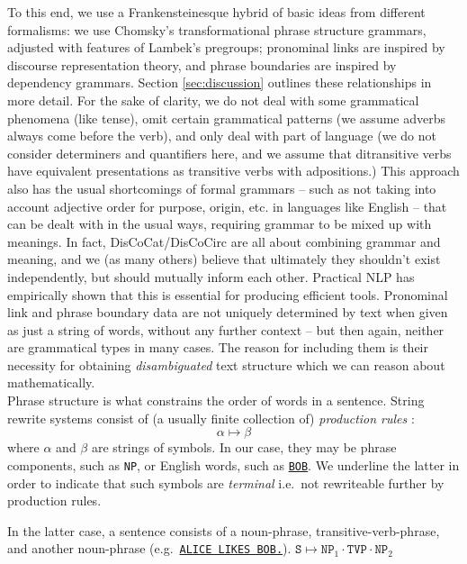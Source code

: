  To this end, we use a Frankensteinesque hybrid of basic ideas from different formalisms: we use Chomsky's transformational phrase structure grammars, adjusted with features of Lambek's pregroups; pronominal links are inspired by discourse representation theory, and phrase boundaries are inspired by dependency grammars. Section \ref{sec:discussion} outlines these relationships in more detail. For the sake of clarity, we do not deal with some grammatical phenomena (like tense), omit certain grammatical patterns (we assume adverbs always come before the verb), and only deal with part of language (we do not consider determiners and quantifiers here, and we assume that ditransitive verbs have equivalent presentations as transitive verbs with adpositions.) This approach also has the usual shortcomings of formal grammars -- such as not taking into account adjective order for purpose, origin, etc. in languages like English -- that can be dealt with in the usual ways, requiring grammar to be mixed up with meanings. In fact, DisCoCat/DisCoCirc are all about combining grammar and meaning, and we (as many others) believe that ultimately they shouldn't exist independently, but should mutually inform each other. Practical NLP has empirically shown that this is essential for producing efficient tools. Pronominal link and phrase boundary data are not uniquely determined by text when given as just a string of words, without any further context -- but then again, neither are grammatical types in many cases. The reason for including them is their necessity for obtaining \emph{disambiguated} text structure which we can reason about mathematically.\\

 Phrase structure is what constrains the order of words in a sentence. String rewrite systems consist of (a usually finite collection of) \emph{production rules} \cite{hopcroft_introduction_1979}:
\[  
\alpha \mapsto \beta
\]
where $\alpha$ and $\beta$ are strings of symbols.  In our case, they may be phrase components, such as \texttt{NP}, or English words, such as \texttt{\underline{BOB}}. We underline the latter in order to indicate that such symbols are \emph{terminal} i.e.~not rewriteable further by production rules.

\begin{marginfigure}
\centering
{}
\caption{In the latter case, a sentence consists of a noun-phrase, transitive-verb-phrase, and another noun-phrase (e.g.~\texttt{\underline{ALICE LIKES BOB.}}). $\texttt{S} \mapsto \texttt{NP}_1 \cdot \texttt{TVP} \cdot \texttt{NP}_2$}
\end{marginfigure}

